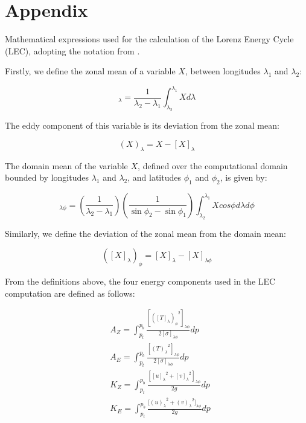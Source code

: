 \documentclass[pdflatex,sn-chicago]{sn-jnl}%
\theoremstyle{plain}
\theoremstyle{definition}
\theoremstyle{remark}
\theoremstyle{definition}
\begin{document}
\backmatter



\section*{Appendix}


Mathematical expressions used for the calculation of the Lorenz Energy Cycle (LEC), adopting the notation from \citet{michaelides1987limited}. 


Firstly, we define the zonal mean of a variable $X$, between longitudes $\lambda_{1}$ and $\lambda_{2}$:

 \begin{equation}
     [X]_\lambda = \frac{1}{\lambda_2 - \lambda_1} \int_{\lambda_2}^{\lambda_1} X d\lambda
 \end{equation}

The eddy component of this variable is its deviation from the zonal mean:

\begin{equation}
    (X)_\lambda =  X - [X]_\lambda
\end{equation}

The domain mean of the variable $X$, defined over the computational domain bounded by longitudes $\lambda_1$ and $\lambda_2$, and latitudes $\phi_1$ and $\phi_2$, is given by:

\begin{equation}
    [X]_{\lambda\phi} = \left(\frac{1}{\lambda_2 - \lambda_1}\right)  \left(\frac{1}{\sin\phi_2 - \sin\phi_1}\right) \int_{\lambda_2}^{\lambda_1} X cos\phi d\lambda d\phi 
\end{equation}

Similarly, we define the deviation of the zonal mean from the domain mean:

\begin{equation}
    ([X]_\lambda)_\phi = [X]_\lambda - [X]_{\lambda\phi}
\end{equation}

From the definitions above, the four energy components used in the LEC computation are defined as follows:

\begin{align}
   &A_Z = \int_{p_t}^{p_b} \frac{[{([T]_\lambda)_\phi}^{2}]_{\lambda \phi}}{2[\sigma]_{\lambda \phi}} dp \label{eq:AZ} \\
   &A_E = \int_{p_t}^{p_b} \frac{[{(T)_\lambda}^{2}]_{\lambda \phi}}{2[\sigma]_{\lambda \phi}} dp \label{eq:AE} \\
   &K_Z =  \int_{p_t}^{p_b} \frac{[{[u]_\lambda}^2 + {[v]_\lambda}^2]_{\lambda \phi}}{2g} dp \label{eq:KZ} \\
   &K_E =  \int_{p_t}^{p_b} \frac{{[(u)_\lambda}^2 + {(v)_\lambda}^2]_{\lambda \phi}}{2g} dp \label{eq:KE}
\end{align}
\end{document}
